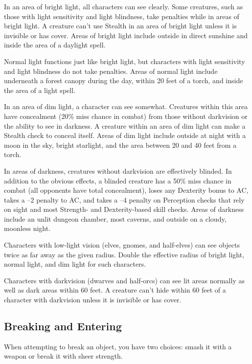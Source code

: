 
				
In an area of bright light, all characters can see clearly. Some creatures, such as those with light sensitivity and light blindness, take penalties while in areas of bright light. A creature can't use Stealth in an area of bright light unless it is invisible or has cover. Areas of bright light include outside in direct sunshine and inside the area of a daylight spell.
				
Normal light functions just like bright light, but characters with light sensitivity and light blindness do not take penalties. Areas of normal light include underneath a forest canopy during the day, within 20 feet of a torch, and inside the area of a light spell.
				
In an area of dim light, a character can see somewhat. Creatures within this area have concealment (20\% miss chance in combat) from those without darkvision or the ability to see in darkness. A creature within an area of dim light can make a Stealth check to conceal itself. Areas of dim light include outside at night with a moon in the sky, bright starlight, and the area between 20 and 40 feet from a torch.
				
In areas of darkness, creatures without darkvision are effectively blinded. In addition to the obvious effects, a blinded creature has a 50\% miss chance in combat (all opponents have total concealment), loses any Dexterity bonus to AC, takes a --2 penalty to AC, and takes a --4 penalty on Perception checks that rely on sight and most Strength- and Dexterity-based skill checks. Areas of darkness include an unlit dungeon chamber, most caverns, and outside on a cloudy, moonless night.
				
Characters with low-light vision (elves, gnomes, and half-elves) can see objects twice as far away as the given radius. Double the effective radius of bright light, normal light, and dim light for such characters.
				
Characters with darkvision (dwarves and half-orcs) can see lit areas normally as well as dark areas within 60 feet. A creature can't hide within 60 feet of a character with darkvision unless it is invisible or has cover.
				
\subsection{Breaking and Entering}

				
When attempting to break an object, you have two choices: smash it with a weapon or break it with sheer strength.

